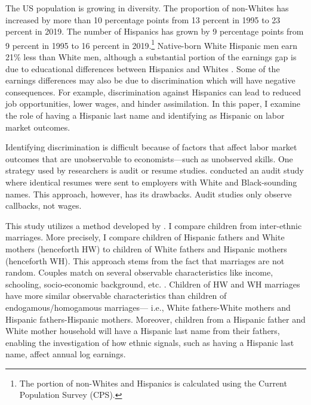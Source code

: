 \documentclass[12pt,english]{article}
\begin{document}
The US population is growing in diversity. The proportion of non-Whites has increased by more than 10 percentage points from 13 percent in 1995 to 23 percent in 2019. The number of Hispanics has grown by 9 percentage points from 9 percent in 1995 to 16 percent in 2019.\footnote{The portion of non-Whites and Hispanics is calculated using the Current Population Survey (CPS).} Native-born White Hispanic men earn 21\% less than White men, although a substantial portion of the earnings gap is due to educational differences between Hispanics and Whites \autocite{duncan2006hispanics, duncan2018identifying, duncan2018socioeconomic}. Some of the earnings differences may also be due to discrimination which will have negative consequences. For example, discrimination against Hispanics can lead to reduced job opportunities, lower wages, and hinder assimilation. In this paper, I examine the role of having a Hispanic last name and identifying as Hispanic on labor market outcomes. 

Identifying discrimination is difficult because of factors that affect labor market outcomes that are unobservable to economists---such as unobserved skills. One strategy used by researchers is audit or resume studies. \textcite{bertrand2004emily} conducted an audit study where identical resumes were sent to employers with White and Black-sounding names. This approach, however, has its drawbacks. Audit studies only observe callbacks, not wages. 

This study utilizes a method developed by \textcite{rubinstein2014pride}. I compare children from inter-ethnic marriages. More precisely, I compare children of Hispanic fathers and White mothers (henceforth HW) to children of White fathers and Hispanic mothers (henceforth  WH). This approach stems from the fact that marriages are not random. Couples match on several observable characteristics like income, schooling, socio-economic background, etc. \autocite{averettBetterWorseRelationship2008, averettEconomicRealityBeauty1996, beckerTheoryMarriagePart1973, beckerTheoryMarriagePart1974, beckerTreatiseFamily1993, browningCollectiveUnitaryModels2006, chiapporiFatterAttractionAnthropometric2012}. Children of HW and WH marriages have more similar observable characteristics than children of endogamous/homogamous marriages--- i.e., White fathers-White mothers and Hispanic fathers-Hispanic mothers. Moreover, children from a Hispanic father and White mother household will have a Hispanic last name from their fathers, enabling the investigation of how ethnic signals, such as having a Hispanic last name, affect annual log earnings.
\end{document}
